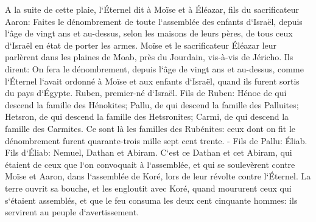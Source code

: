\verse A la suite de cette plaie, l`Éternel dit à Moïse et à Éléazar, fils du sacrificateur Aaron: 
\verse Faites le dénombrement de toute l`assemblée des enfants d`Israël, depuis l`âge de vingt ans et au-dessus, selon les maisons de leurs pères, de tous ceux d`Israël en état de porter les armes. 
\verse Moïse et le sacrificateur Éléazar leur parlèrent dans les plaines de Moab, près du Jourdain, vis-à-vis de Jéricho. Ils dirent: 
\verse On fera le dénombrement, depuis l`âge de vingt ans et au-dessus, comme l`Éternel l`avait ordonné à Moïse et aux enfants d`Israël, quand ils furent sortis du pays d`Égypte. 
\verse Ruben, premier-né d`Israël. Fils de Ruben: Hénoc de qui descend la famille des Hénokites; Pallu, de qui descend la famille des Palluites; 
\verse Hetsron, de qui descend la famille des Hetsronites; Carmi, de qui descend la famille des Carmites. 
\verse Ce sont là les familles des Rubénites: ceux dont on fit le dénombrement furent quarante-trois mille sept cent trente. - 
\verse Fils de Pallu: Éliab. 
\verse Fils d`Éliab: Nemuel, Dathan et Abiram. C`est ce Dathan et cet Abiram, qui étaient de ceux que l`on convoquait à l`assemblée, et qui se soulevèrent contre Moïse et Aaron, dans l`assemblée de Koré, lors de leur révolte contre l`Éternel. 
\verse La terre ouvrit sa bouche, et les engloutit avec Koré, quand moururent ceux qui s`étaient assemblés, et que le feu consuma les deux cent cinquante hommes: ils servirent au peuple d`avertissement. 
